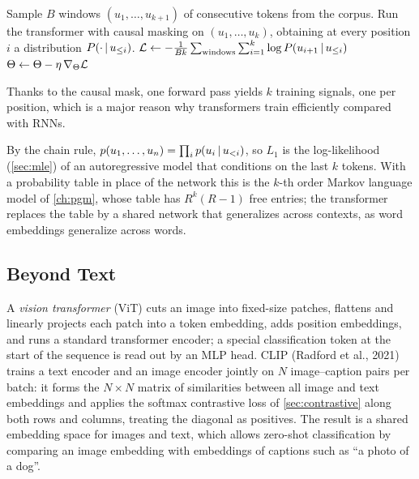\begin{algorithm}[H]
\caption{Next-Token Pretraining of a Transformer Language Model}\label{alg:lm-train}
\begin{algorithmic}[1]
\Repeat
  \State Sample $B$ windows $(u_1,\dots,u_{k+1})$ of consecutive tokens from the corpus.
  \State Run the transformer with causal masking on $(u_1,\dots,u_k)$, obtaining at every position $i$ a distribution $P(\cdot\,|\, u_{\le i})$.
  \State $\mathcal{L}\gets-\frac1{Bk}\sum_{\text{windows}}\sum_{i=1}^k\log P(u_{i+1}\,|\, u_{\le i})$ 
  \State $\Theta\gets\Theta-\eta\,\nabla_\Theta\mathcal{L}$ 
\end{algorithmic}
\end{algorithm}

Thanks to the causal mask, one forward pass yields $k$ training signals, one per position, which is a major reason why transformers train efficiently compared with RNNs.

\begin{remark}
By the chain rule, $p(u_1,\dots,u_n)=\prod_ip(u_i\,|\, u_{<i})$, so $L_1$ is the log-likelihood (\cref{sec:mle}) of an autoregressive model that conditions on the last $k$ tokens. With a probability table in place of the network this is the $k$-th order Markov language model of \cref{ch:pgm}, whose table has $R^k(R-1)$ free entries; the transformer replaces the table by a shared network that generalizes across contexts, as word embeddings generalize across words.
\end{remark}

\subsection{Beyond Text}

A \emph{vision transformer} (ViT) cuts an image into fixed-size patches, flattens and linearly projects each patch into a token embedding, adds position embeddings, and runs a standard transformer encoder; a special classification token at the start of the sequence is read out by an MLP head. CLIP (Radford et al., 2021) trains a text encoder and an image encoder jointly on $N$ image--caption pairs per batch: it forms the $N\times N$ matrix of similarities between all image and text embeddings and applies the softmax contrastive loss of \cref{sec:contrastive} along both rows and columns, treating the diagonal as positives. The result is a shared embedding space for images and text, which allows zero-shot classification by comparing an image embedding with embeddings of captions such as ``a photo of a dog''.


